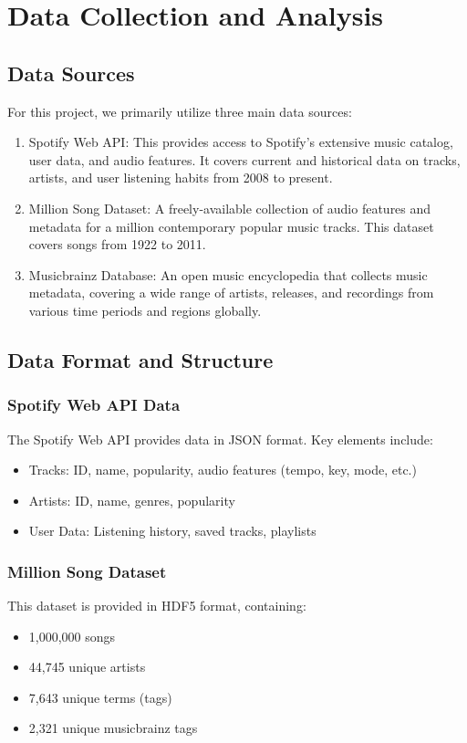 \documentclass[runningheads]{llncs}
\begin{document}
\section{Data Collection and Analysis}

\subsection{Data Sources}
For this project, we primarily utilize three main data sources:

\begin{enumerate}
    \item Spotify Web API: This provides access to Spotify's extensive music catalog, user data, and audio features. It covers current and historical data on tracks, artists, and user listening habits from 2008 to present.
    \item Million Song Dataset: A freely-available collection of audio features and metadata for a million contemporary popular music tracks. This dataset covers songs from 1922 to 2011.
    \item Musicbrainz Database: An open music encyclopedia that collects music metadata, covering a wide range of artists, releases, and recordings from various time periods and regions globally.
\end{enumerate}

\subsection{Data Format and Structure}
\subsubsection{Spotify Web API Data}
The Spotify Web API provides data in JSON format. Key elements include:
\begin{itemize}
    \item Tracks: ID, name, popularity, audio features (tempo, key, mode, etc.)
    \item Artists: ID, name, genres, popularity
    \item User Data: Listening history, saved tracks, playlists
\end{itemize}

\subsubsection{Million Song Dataset}
This dataset is provided in HDF5 format, containing:
\begin{itemize}
    \item 1,000,000 songs
    \item 44,745 unique artists
    \item 7,643 unique terms (tags)
    \item 2,321 unique musicbrainz tags
\end{itemize}
\end{document}
